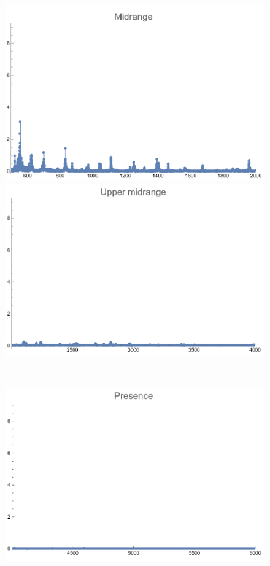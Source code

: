 \documentclass[12pt, letterpaper]{article}
\begin{document}
\begin{figure}[H]
\begin{minipage}{.3\textwidth}
  \end{minipage}
  \begin{minipage}{0.03\textwidth}\end{minipage}
  \begin{minipage}{.3\textwidth}
    \centering
    \includegraphics[width=.9\linewidth]{imgs/Cancion8/mid.png}
  \end{minipage}
  \begin{minipage}{0.03\textwidth}\end{minipage}
  \begin{minipage}{.3\textwidth}
    \centering
    \includegraphics[width=.9\linewidth]{imgs/Cancion8/upmid.png}
  \end{minipage} \medskip \\
  \begin{minipage}{.3\textwidth}
    \centering
    \includegraphics[width=.9\linewidth]{imgs/Cancion8/presence.png}

\end{minipage}
\end{figure}
\end{document}
